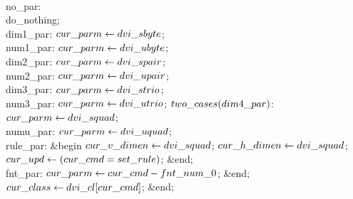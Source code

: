 \4\\{no\_par}: \\{do\_nothing};\6
\4\\{dim1\_par}: $\\{cur\_parm}\gets\\{dvi\_sbyte}$;\6
\4\\{num1\_par}: $\\{cur\_parm}\gets\\{dvi\_ubyte}$;\6
\4\\{dim2\_par}: $\\{cur\_parm}\gets\\{dvi\_spair}$;\6
\4\\{num2\_par}: $\\{cur\_parm}\gets\\{dvi\_upair}$;\6
\4\\{dim3\_par}: $\\{cur\_parm}\gets\\{dvi\_strio}$;\6
\4\\{num3\_par}: $\\{cur\_parm}\gets\\{dvi\_utrio}$;\6
\4$\\{two\_cases}(\\{dim4\_par})$: $\\{cur\_parm}\gets\\{dvi\_squad}$;\6
\4\\{numu\_par}: $\\{cur\_parm}\gets\\{dvi\_uquad}$;\6
\4\\{rule\_par}: \&{begin} $\\{cur\_v\_dimen}\gets\\{dvi\_squad}$;\5
$\\{cur\_h\_dimen}\gets\\{dvi\_squad}$;\5
$\\{cur\_upd}\gets(\\{cur\_cmd}=\\{set\_rule})$;\6
\&{end};\6
\4\\{fnt\_par}: $\\{cur\_parm}\gets\\{cur\_cmd}-\\{fnt\_num\_0}$;\2\6
\&{end};\6
$\\{cur\_class}\gets\\{dvi\_cl}[\\{cur\_cmd}]$;\6
\&{end};\par
\fi

